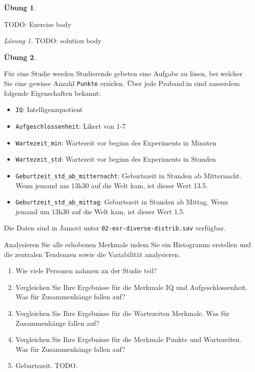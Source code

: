 \documentclass[
]{book}
\providecommand{\tightlist}{%
  \setlength{\itemsep}{0pt}\setlength{\parskip}{0pt}}
\theoremstyle{definition}
\theoremstyle{definition}
\theoremstyle{definition}
\newtheorem{exercise}{Übung}[chapter]
\theoremstyle{definition}
\theoremstyle{remark}
\newtheorem*{solution}{Lösung}
\begin{document}
\begin{exercise}
\protect\hypertarget{exr:temptag-poiane}{}\label{exr:temptag-poiane}\leavevmode

TODO: Exercise body

\end{exercise}

\begin{solution}
TODO: solution body
\end{solution}

\begin{exercise}
\protect\hypertarget{exr:diverse-distrib}{}\label{exr:diverse-distrib}\leavevmode

Für eine Studie werden Studierende gebeten eine Aufgabe zu lösen, bei welcher Sie eine gewisse Anzahl \texttt{Punkte} erzielen. Über jede Proband:in sind ausserdem folgende Eigenschaften bekannt:

\begin{itemize}
\tightlist
\item
  \texttt{IQ}: Intelligenzquotient
\item
  \texttt{Aufgeschlossenheit}: Likert von 1-7
\item
  \texttt{Wartezeit\_min}: Wartezeit vor beginn des Experiments in Minuten
\item
  \texttt{Wartezeit\_std}: Wartezeit vor beginn des Experiments in Stunden
\item
  \texttt{Geburtzeit\_std\_ab\_mitternacht}: Geburtszeit in Stunden ab Mitternacht. Wenn jemand um 13h30 auf die Welt kam, ist dieser Wert 13.5.
\item
  \texttt{Geburtzeit\_std\_ab\_mittag}: Geburtszeit in Stunden ab Mittag. Wenn jemand um 13h30 auf die Welt kam, ist dieser Wert 1.5.
\end{itemize}

Die Daten sind in Jamovi unter \texttt{02-exr-diverse-distrib.sav} verfügbar.

Analysieren Sie alle erhobenen Merkmale indem Sie ein Histogramm erstellen und die zentralen Tendenzen sowie die Variabilität analysieren.

\begin{enumerate}
\def\labelenumi{\alph{enumi}.}
\tightlist
\item
  Wie viele Personen nahmen an der Studie teil?
\item
  Vergleichen Sie Ihre Ergebnisse für die Merkmale IQ und Aufgeschlossenheit. Was für Zusammenhänge fallen auf?
\item
  Vergleichen Sie Ihre Ergebnisse für die Wartezeiten Merkmale. Was für Zusammenhänge fallen auf?
\item
  Vergleichen Sie Ihre Ergebnisse für die Merkmale Punkte und Wartezeiten. Was für Zusammenhänge fallen auf?
\item
  Geburtszeit. TODO.
\end{enumerate}

\end{exercise}
\end{document}
